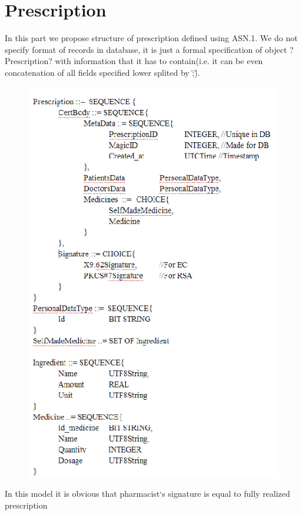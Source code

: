 \section{Prescription}
In this part we propose structure of prescription defined using ASN.1. We do not specify format of records in database, it is just a formal specification of object ?Prescription? with information that it has to contain(i.e. it can be even concatenation of all fields specified lower splited by \";\").

\begin{figure}[h]
\centering
\includegraphics[width=\textwidth,height=\textheight,keepaspectratio]{doctor/asn1.png}
\end{figure} 
In this model it is obvious that pharmacist`s signature is equal to fully realized prescription


